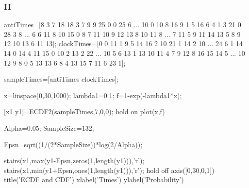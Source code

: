 \subsubsection*{II}

\begin{VrbM}
antiTimes=[8 3 7 18 18 3 7 9 9 25 0 0 25 6 ...
  10 0 10 8 16 9 1 5 16 6 4 1 3 21 0 28 3 8 ...
  6 6 11 8 10 15 0 8 7 11 10 9 12 13 8 10 11 8 ...
    7 11 5 9 11 14 13 5 8 9 12 10 13 6 11 13];
clockTimes=[0 0 11 1 9 5 14 16 2 10 21 1 14 2 10 ...
    24 6 1 14 14 0 14 4 11 15 0 10 2 13 2 22 ...
    10 5 6 13 1 13 10 11 4 7 9 12 8 16 15 14 5 ...
    10 12 9 8 0 5 13 13 6 8 4 13 15 7 11 6 23 1];


sampleTimes=[antiTimes clockTimes];%

x=linspace(0,30,1000);%
lambda1=0.1;%
f=1-exp(-lambda1*x);%

[x1 y1]=ECDF2(sampleTimes,7,0,0);
hold on%
plot(x,f)

Alpha=0.05;%
SampleSize=132;

Epsn=sqrt((1/(2*SampleSize))*log(2/Alpha));%

stairs(x1,max(y1-Epsn,zeros(1,length(y1))),'r');%
stairs(x1,min(y1+Epsn,ones(1,length(y1))),'r');%
hold off
axis([0,30,0,1])
title('ECDF and CDF')
xlabel('Times')
ylabel('Probability')
\end{VrbM}
